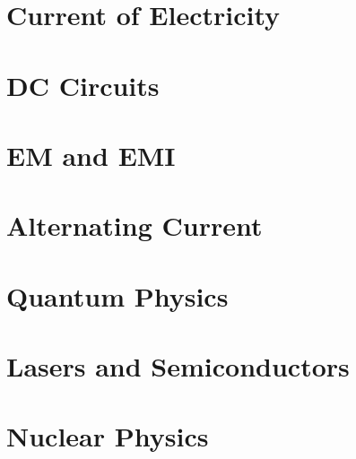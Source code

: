 \documentclass[a4paper]{article}
\begin{document}
	\section{Current of Electricity}
	\section{DC Circuits}
	\section{EM and EMI}
	\section{Alternating Current}
	\section{Quantum Physics}
	\section{Lasers and Semiconductors}
	\section{Nuclear Physics}
	
\end{document}
